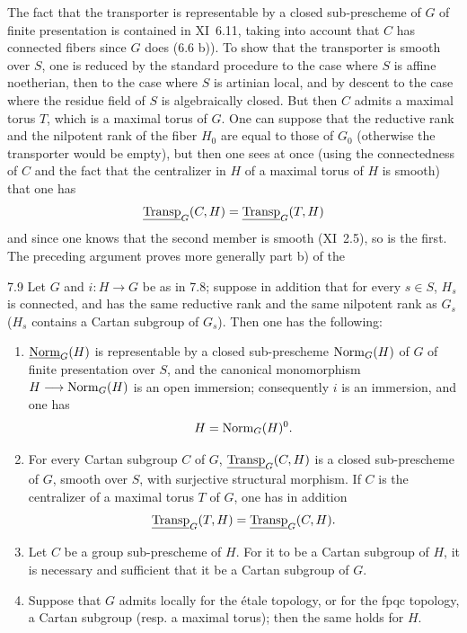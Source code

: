 The fact that the transporter is representable by a closed sub-prescheme of $G$ of finite presentation is contained in XI~6.11, taking into account that $C$ has connected fibers since $G$ does (6.6 b)). To show that the transporter is smooth over $S$, one is reduced by the standard procedure to the case where $S$ is affine noetherian, then to the case where $S$ is artinian local, and by descent to the case where the residue field of $S$ is algebraically closed. But then $C$ admits a maximal torus $T$, which is a maximal torus of $G$. One can suppose that the reductive rank and the nilpotent rank of the fiber $H_0$ are equal to those of $G_0$ (otherwise the transporter would be empty), but then one sees at once (using the connectedness of $C$ and the fact that the centralizer in $H$ of a maximal torus of $H$ is smooth) that one has
\[
\underline{\operatorname{Transp}}_G(C,H)=\underline{\operatorname{Transp}}_G(T,H)
\]
and since one knows that the second member is smooth (XI~2.5), so is the first. The preceding argument proves more generally part b) of the
\begin{proposition}{7.9}\label{XII.7.9}
Let $G$ and $i:H\to G$ be as in 7.8; suppose in addition that for every $s\in S$, $H_s$ is connected, and has the same reductive rank and the same nilpotent rank as $G_s$ (\ie $H_s$ contains a Cartan subgroup of $G_s$). Then one has the following:
\begin{enumerate}[label=\alph*)]
\item $\underline{\mathrm{Norm}}_G(H)$ is representable by a closed sub-prescheme $\operatorname{Norm}_G(H)$ of $G$ of finite presentation over $S$, and the canonical monomorphism $H\longrightarrow\operatorname{Norm}_G(H)$ is an open immersion; consequently $i$ is an immersion, and one has
\[
H=\operatorname{Norm}_G(H)^0.
\]
\item For every Cartan subgroup $C$ of $G$, $\underline{\operatorname{Transp}}_G(C,H)$ is a closed sub-prescheme of $G$, smooth over $S$, with surjective structural morphism. If $C$ is the centralizer of a maximal torus $T$ of $G$, one has in addition
\[
\underline{\operatorname{Transp}}_G(T,H)=\underline{\operatorname{Transp}}_G(C,H).
\]
\item Let $C$ be a group sub-prescheme of $H$. For it to be a Cartan subgroup of $H$, it is necessary and sufficient that it be a Cartan subgroup of $G$.
\item Suppose that $G$ admits locally for the étale topology, or for the fpqc topology, a Cartan subgroup (resp. a maximal torus); then the same holds for $H$.
\end{enumerate}
\end{proposition}
